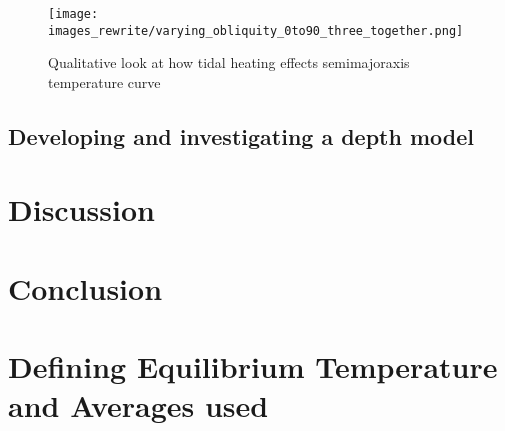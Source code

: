 \documentclass[12pt, onecolumn]{revtex4-2}    %
\begin{document}
\begin{figure}
  \texttt{[image: images\_rewrite/varying\_obliquity\_0to90\_three\_together.png]}
  \caption{
    Qualitative look at how tidal heating effects semimajoraxis temperature curve
  }
  \label{fig:qualitative_tidalheating_obliquity}
\end{figure}




\subsection{Developing and investigating a depth model} \label{ssec:DevInvDepthModel} %

\section{Discussion} \label{sec:Discussion}

\section{Conclusion} \label{sec:Conclusion}






\clearpage

\appendix

\section{Defining Equilibrium Temperature and Averages used} \label{appx:EquilTempAverages}
\end{document}
